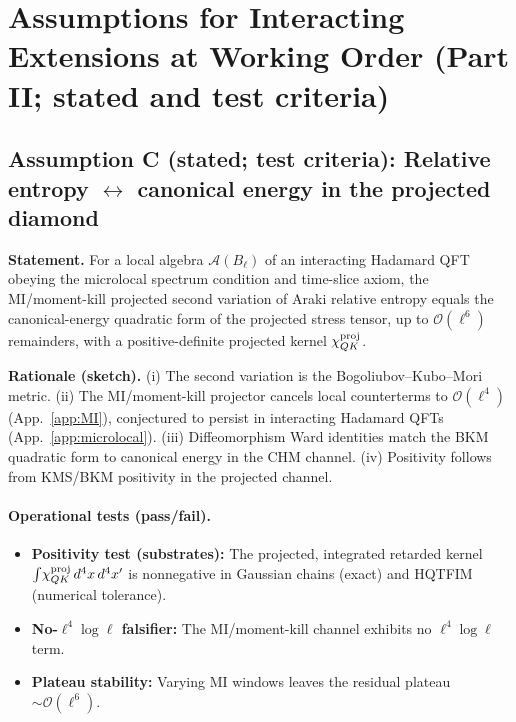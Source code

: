 \documentclass[aps,prd,onecolumn,superscriptaddress,nofootinbib]{revtex4-2}
\begin{document}
\section{Assumptions for Interacting Extensions at Working Order (Part II; stated and test criteria)}
\label{sec:proofs}

\subsection{Assumption C (stated; test criteria): Relative entropy \texorpdfstring{$\leftrightarrow$}{<->} canonical energy in the projected diamond}
\label{sec:lemmaC}
\noindent\textbf{Statement.} For a local algebra \(\mathcal A(B_\ell)\) of an interacting Hadamard QFT obeying the microlocal spectrum condition and time-slice axiom, the MI/moment-kill projected second variation of Araki relative entropy equals the canonical-energy quadratic form of the projected stress tensor, up to \(\mathcal O(\ell^6)\) remainders, with a positive-definite projected kernel \(\chi_{QK}^{\rm proj}\).

\smallskip
\noindent\textbf{Rationale (sketch).} (i) The second variation is the Bogoliubov–Kubo–Mori metric. (ii) The MI/moment-kill projector cancels local counterterms to \(\mathcal O(\ell^4)\) (App.~\ref{app:MI}), conjectured to persist in interacting Hadamard QFTs (App.~\ref{app:microlocal}). (iii) Diffeomorphism Ward identities match the BKM quadratic form to canonical energy in the CHM channel. (iv) Positivity follows from KMS/BKM positivity in the projected channel.

\paragraph{Operational tests (pass/fail).}
\begin{itemize}[leftmargin=*,noitemsep,topsep=0pt]
\item \textbf{Positivity test (substrates):} The projected, integrated retarded kernel \(\int\!\chi^{\rm proj}_{QK}\,d^4x\,d^4x'\) is nonnegative in Gaussian chains (exact) and HQTFIM (numerical tolerance).
\item \textbf{No-\(\ell^4\log\ell\) falsifier:} The MI/moment-kill channel exhibits no \(\ell^4\log\ell\) term.
\item \textbf{Plateau stability:} Varying MI windows leaves the residual plateau \(\sim\mathcal O(\ell^6)\).
\end{itemize}
\end{document}
